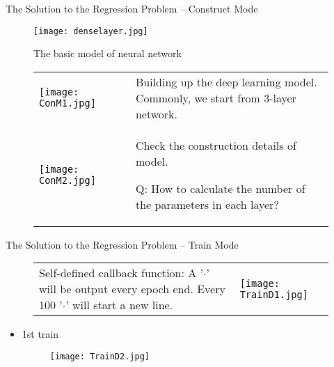 \documentclass{beamer}
\begin{document}
\begin{frame}{The Solution to the Regression Problem -- Construct Mode}
\begin{figure}
  \texttt{[image: denselayer.jpg]}\\
  \caption{The basic model of neural network}
\end{figure}
\end{frame}

\begin{frame}
\begin{figure}
  \begin{flushleft}
  \begin{tabular}{p{} p{} p{}}
  \vspace{-30pt}\texttt{[image: ConM1.jpg]}& &\vspace{30pt}\small{Building up the deep learning model. Commonly, we start from 3-layer network.}\\
  \vspace{-10pt}\texttt{[image: ConM2.jpg]}& &\vspace{20pt}\small{Check the construction details of model.

  {\color{red} Q: How to calculate the number of the parameters in each layer?}}
  \end{tabular}
  \end{flushleft}
\end{figure}

\end{frame}


\begin{frame}{The Solution to the Regression Problem -- Train Mode}
\begin{figure}
  \begin{flushleft}
  \begin{tabular}{p{} p{}}
  \vspace{-10pt}\small{Self-defined callback function: A '$\cdot$' will be output every epoch end. Every 100 '$\cdot$' will start a new line.}& \vspace{-10pt}\texttt{[image: TrainD1.jpg]}
  \end{tabular}
  \end{flushleft}
\end{figure}

\begin{itemize}
  \item 1st train
\begin{figure}
  \texttt{[image: TrainD2.jpg]}\\
\end{figure}

\end{itemize}

\end{frame}
\end{document}
